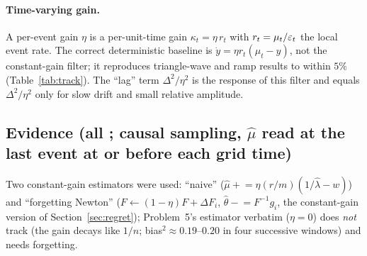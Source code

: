 \paragraph{Time-varying gain.} A per-event gain $\eta$ is a per-unit-time gain $\kappa_t=\eta\,r_t$ with $r_t=\mu_t/\varepsilon_t$ the local event rate. The correct deterministic baseline is $\dot y=\eta r_t(\mu_t-y)$, not the constant-gain filter; it reproduces triangle-wave and ramp results to within $5\%$ (Table~\ref{tab:track}). The ``lag'' term $\Delta^2/\eta^2$ is the response of this filter and equals $\Delta^2/\eta^2$ only for slow drift and small relative amplitude.

\subsection{Evidence (all \Nt{}; causal sampling, $\hat\mu$ read at the last event at or before each grid time)}

Two constant-gain estimators were used: ``naive'' ($\hat\mu\mathrel{+}=\eta(r/m)(1/\hat\lambda-w)$) and ``forgetting Newton'' ($F\leftarrow(1-\eta)F+\Delta F_i$, $\hat\theta\mathrel{-}=F^{-1}g_i$, the constant-gain version of Section~\ref{sec:regret}); Problem~5's estimator verbatim ($\eta=0$) does \emph{not} track (the gain decays like $1/n$; bias$^2\approx0.19$--$0.20$ in four successive windows) and needs forgetting.

